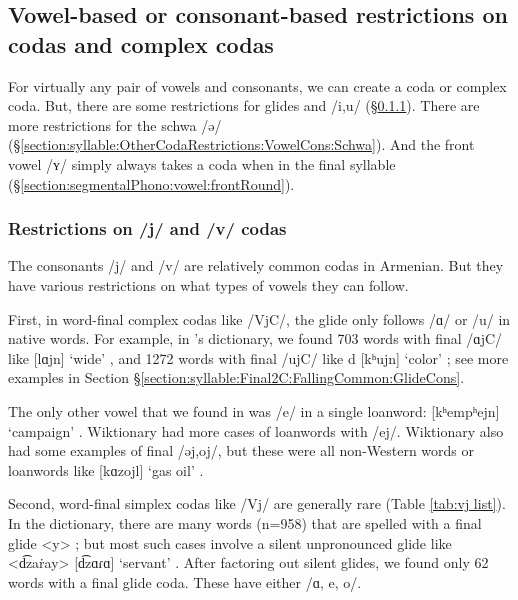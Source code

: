 	\subsection{Vowel-based or consonant-based restrictions on codas and complex codas}\label{section:syllable:OtherCodaRestrictions:VowelCons}
	For virtually any pair of vowels and consonants, we can create a coda or complex coda. But, there are some restrictions for glides and  /i,u/ (\S\ref{section:syllable:OtherCodaRestrictions:VowelCons:High}). There are more restrictions for the schwa /ə/ (\S\ref{section:syllable:OtherCodaRestrictions:VowelCons:Schwa}). And the front vowel /ʏ/ simply always takes a coda when in the final syllable (\S\ref{section:segmentalPhono:vowel:frontRound}). 
	
	\subsubsection{Restrictions on /j/ and /v/ codas}  \label{section:syllable:OtherCodaRestrictions:VowelCons:High}
	
	
	The consonants  /j/ and /v/  are   relatively common codas in Armenian. But they have various restrictions on what types of vowels they can follow. 
	
	First, in word-final complex codas like /VjC/, the glide only follows /ɑ/ or /u/ in native words. For example, in \citet{kouyoumdjian-1970-DictionaryArmenianEnglish}'s dictionary, we found 703 words with final /ɑjC/ like [lɑjn] `wide' , and 1272 words with final /ujC/ like d [kʰujn] `color' ; see more examples in Section \S\ref{section:syllable:Final2C:FallingCommon:GlideCons}. 
	
	
	The only other vowel that we found in \citet{kouyoumdjian-1970-DictionaryArmenianEnglish} was /e/ in a single loanword: [kʰempʰejn] `campaign' . Wiktionary had more cases of loanwords with /ej/.  Wiktionary also had some examples of final /əj,oj/, but these were all non-Western words or loanwords like [kɑzojl] `gas oil' . 
	
	Second,   word-final simplex codas like /Vj/ are generally rare (Table \ref{tab:vj list}). In the \citet{kouyoumdjian-1970-DictionaryArmenianEnglish} dictionary,   there are many words (n=958) that are spelled with a final glide <y> ; but  most such cases involve a silent unpronounced glide like <d͡zaṙay> [d͡zɑɾɑ] `servant' . After factoring out silent glides, we found only 62 words with a final glide coda. These have either /ɑ, e, o/. 
	
